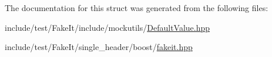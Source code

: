 The documentation for this struct was generated from the following files\+:\begin{DoxyCompactItemize}
\item 
include/test/\+Fake\+It/include/mockutils/\mbox{\hyperlink{DefaultValue_8hpp}{Default\+Value.\+hpp}}\item 
include/test/\+Fake\+It/single\+\_\+header/boost/\mbox{\hyperlink{single__header_2boost_2fakeit_8hpp}{fakeit.\+hpp}}\end{DoxyCompactItemize}
